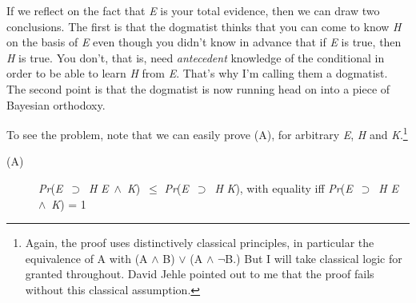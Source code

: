 If we reflect on the fact that \textit{E} is your total evidence, then we can draw two conclusions. The first is that the dogmatist thinks that you can come to know \textit{H} on the basis of \textit{E} even though you didn't know in advance that if \textit{E} is true, then \textit{H} is true. You don't, that is, need \textit{antecedent} knowledge of the conditional in order to be able to learn \textit{H} from \textit{E}. That's why I'm calling them a dogmatist. The second point is that the dogmatist is now running head on into a piece of Bayesian orthodoxy.

To see the problem, note that we can easily prove (A), for arbitrary \textit{E}, \textit{H} and \textit{K}.\footnote{ Again, the proof uses distinctively classical principles, in particular the equivalence of A with (A ${\wedge}$ B) ${\vee}$ (A ${\wedge}$ ${\lnot}$B.) But I will take classical logic for granted throughout. David Jehle pointed out to me that the proof fails without this classical assumption.}

\begin{description}
\item[(A)] \textit{Pr}(\textit{E}~${\supset}$~\textit{H} {\textbar} \textit{E}~${\wedge}$~\textit{K})~${\leq}$ \textit{Pr}(\textit{E}~${\supset}$~\textit{H} {\textbar} \textit{K}), with equality iff \textit{Pr}(\textit{E}~${\supset}$~\textit{H} {\textbar} \textit{E}~${\wedge}$~\textit{K}) = 1
\end{description}

